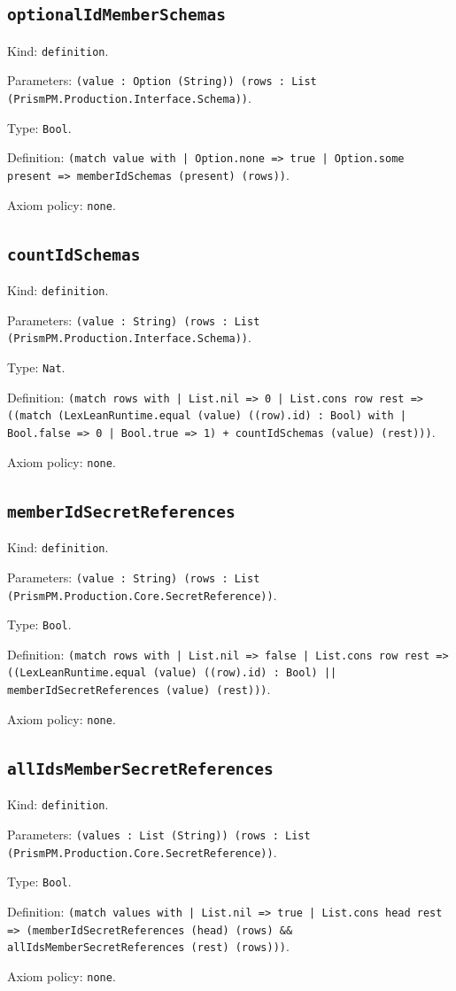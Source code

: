 \documentclass[11pt]{article}
\begin{document}
\subsection*{\texttt{optionalIdMemberSchemas}}
\noindent Kind: \texttt{definition}.\par
\noindent Parameters: \texttt{(value : Option (String)) (rows : List (PrismPM.Production.Interface.Schema))}.\par
\noindent Type: \texttt{Bool}.\par
\noindent Definition: \texttt{(match value with | Option.none => true | Option.some present => memberIdSchemas (present) (rows))}.\par
\noindent Axiom policy: \texttt{none}.\par
\subsection*{\texttt{countIdSchemas}}
\noindent Kind: \texttt{definition}.\par
\noindent Parameters: \texttt{(value : String) (rows : List (PrismPM.Production.Interface.Schema))}.\par
\noindent Type: \texttt{Nat}.\par
\noindent Definition: \texttt{(match rows with | List.nil => 0 | List.cons row rest => ((match (LexLeanRuntime.equal (value) ((row).id) : Bool) with | Bool.false => 0 | Bool.true => 1) + countIdSchemas (value) (rest)))}.\par
\noindent Axiom policy: \texttt{none}.\par
\subsection*{\texttt{memberIdSecretReferences}}
\noindent Kind: \texttt{definition}.\par
\noindent Parameters: \texttt{(value : String) (rows : List (PrismPM.Production.Core.SecretReference))}.\par
\noindent Type: \texttt{Bool}.\par
\noindent Definition: \texttt{(match rows with | List.nil => false | List.cons row rest => ((LexLeanRuntime.equal (value) ((row).id) : Bool) || memberIdSecretReferences (value) (rest)))}.\par
\noindent Axiom policy: \texttt{none}.\par
\subsection*{\texttt{allIdsMemberSecretReferences}}
\noindent Kind: \texttt{definition}.\par
\noindent Parameters: \texttt{(values : List (String)) (rows : List (PrismPM.Production.Core.SecretReference))}.\par
\noindent Type: \texttt{Bool}.\par
\noindent Definition: \texttt{(match values with | List.nil => true | List.cons head rest => (memberIdSecretReferences (head) (rows) \&\& allIdsMemberSecretReferences (rest) (rows)))}.\par
\noindent Axiom policy: \texttt{none}.\par
\end{document}
